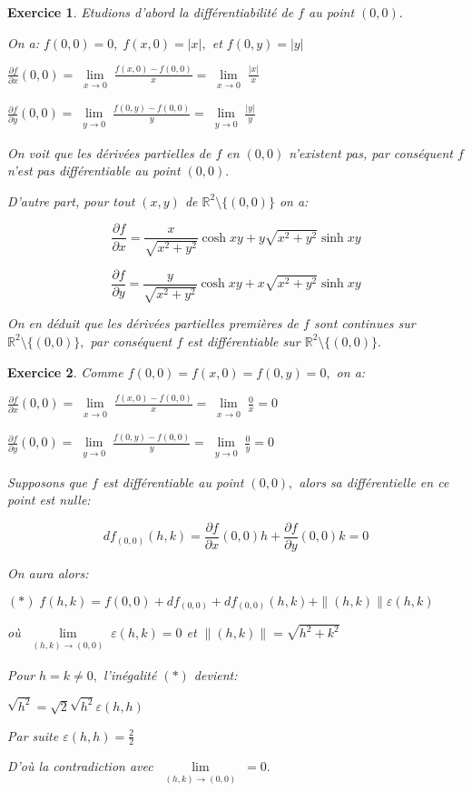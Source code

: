 \documentclass[11pt,a4paper]{report}
\newtheorem{exo}{Exercice}[section]
\begin{document}
\begin{exo}
Etudions d'abord la différentiabilité de $f$ au point $(0,0).$

On a: $f(0,0)=0,\;f(x,0)=|x|,$ et $f(0,y)=|y|$

$\frac{\partial f}{\partial x}(0,0)=\lim\limits_{\substack{x\rightarrow0}}\frac{f(x,0)-f(0,0)}{x}=\lim\limits_{\substack{x\rightarrow0}}\frac{|x|}{x}$

$\frac{\partial f}{\partial y}(0,0)=\lim\limits_{\substack{y\rightarrow0}}\frac{f(0,y)-f(0,0)}{y}=\lim\limits_{\substack{y\rightarrow0}}\frac{|y|}{y}$

On voit que les dérivées partielles de $f$ en $(0,0)$ n'existent pas, par conséquent $f$ n'est pas différentiable au point $(0,0).$

D'autre part, pour tout $(x,y)$ de $\mathbb{R}^2\setminus\{(0,0)\}$ on a:

$$\frac{\partial f}{\partial x}=\frac{x}{\sqrt{x^2+y^2}}\cosh xy+y\sqrt{x^2+y^2}\sinh xy$$

$$\frac{\partial f}{\partial y}=\frac{y}{\sqrt{x^2+y^2}}\cosh xy+x\sqrt{x^2+y^2}\sinh xy$$

On en déduit que les dérivées partielles premières de $f$ sont continues sur $\mathbb{R}^2\setminus\{(0,0)\},$ par conséquent $f$ est différentiable sur $\mathbb{R}^2\setminus\{(0,0)\}.$
\end{exo}
\begin{exo}
Comme $f(0,0)=f(x,0)=f(0,y)=0,$ on a:

$\frac{\partial f}{\partial x}(0,0)=\lim\limits_{\substack{x\rightarrow0}}\frac{f(x,0)-f(0,0)}{x}=\lim\limits_{\substack{x\rightarrow0}}\frac{0}{x}=0$

$\frac{\partial f}{\partial y}(0,0)=\lim\limits_{\substack{y\rightarrow0}}\frac{f(0,y)-f(0,0)}{y}=\lim\limits_{\substack{y\rightarrow0}}\frac{0}{y}=0$

Supposons que $f$ est différentiable au point $(0,0),$ alors sa différentielle en ce point est nulle:

$$df_{(0,0)}(h,k)=\frac{\partial f}{\partial x}(0,0)h+\frac{\partial f}{\partial y}(0,0)k=0$$

On aura alors:

$(*)\;f(h,k)=f(0,0)+df_{(0,0)}+df_{(0,0)}(h,k)+\|(h,k)\|\varepsilon(h,k)$

où $\lim\limits_{\substack{(h,k)\rightarrow(0,0)}}\varepsilon(h,k)=0$ et $\|(h,k)\|=\sqrt{h^2+k^2}$

Pour $h=k\neq0,$ l'inégalité $(*)$ devient:

$\sqrt{h^2}=\sqrt{2}\sqrt{h^2}\varepsilon(h,h)$

Par suite $\varepsilon(h,h)=\frac{2}{2}$

D'où la contradiction avec $\lim\limits_{\substack{(h,k)\rightarrow(0,0)}}=0.$
\end{exo}
\end{document}
